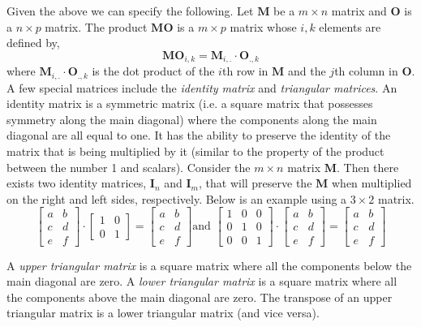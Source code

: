 \documentclass[12pt]{article}
\begin{document}
Given the above we can specify the following. Let $\mathbf{M}$ be a $m\times n$ matrix and $\mathbf{O}$ is a $n \times p$ matrix. The product $\mathbf{M}\mathbf{O}$ is a $m\times p$ matrix whose $i,k$ elements are defined by,
\[
\mathbf{M}\mathbf{O}_{i,k} = \mathbf{M}_{i,.} \cdot \mathbf{O}_{.,k}
\] 
where $\mathbf{M}_{i,.} \cdot \mathbf{O}_{.,k}$ is the dot product of the $i$th row in $\mathbf{M}$ and the $j$th column in $\mathbf{O}$. \\

A few special matrices include the \emph{identity matrix} and \emph{triangular matrices}. An identity matrix is a symmetric matrix (i.e. a square matrix that possesses symmetry along the main diagonal) where the components along the main diagonal are all equal to one. It has the ability to preserve the identity of the matrix that is being multiplied by it (similar to the property of the product between the number 1 and scalars). Consider the $m\times n$ matrix $\mathbf{M}$. Then there exists two identity matrices, $\mathbf{I}_{n}$ and $\mathbf{I}_{m}$, that will preserve the $\mathbf{M}$ when multiplied on the right and left sides, respectively. Below is an example using a $3\times2$ matrix. 
\[
\begin{bmatrix}
a & b \\
c & d \\
e & f
\end{bmatrix}
\cdot
\begin{bmatrix}
1 & 0 \\
0 & 1 
\end{bmatrix}
=
\begin{bmatrix}
a & b \\
c & d \\
e & f
\end{bmatrix}
\mbox{and\ } 
\begin{bmatrix}
1 & 0 & 0 \\
0 & 1 & 0 \\
0 & 0 & 1
\end{bmatrix}
\cdot
\begin{bmatrix}
a & b \\
c & d \\
e & f
\end{bmatrix}
=
\begin{bmatrix}
a & b \\
c & d \\
e & f
\end{bmatrix}
\]

A \emph{upper triangular matrix} is a square matrix where all the components below the main diagonal are zero. A \emph{lower triangular matrix} is a square matrix where all the components above the main diagonal are zero. The transpose of an upper triangular matrix is a lower triangular matrix (and vice versa). \\
\end{document}
